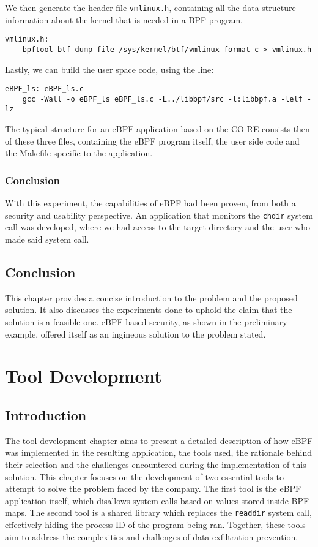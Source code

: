 We then generate the header file \texttt{vmlinux.h}, containing all the data structure information about the kernel that is needed in a BPF program.

\begin{lstlisting}
vmlinux.h:
	bpftool btf dump file /sys/kernel/btf/vmlinux format c > vmlinux.h
\end{lstlisting}

Lastly, we can build the user space code, using the line:
\begin{lstlisting}
eBPF_ls: eBPF_ls.c
	gcc -Wall -o eBPF_ls eBPF_ls.c -L../libbpf/src -l:libbpf.a -lelf -lz
\end{lstlisting}

The typical structure for an eBPF application based on the CO-RE consists then of these three files, containing the eBPF program itself, the user side code and the Makefile specific to the application.


\subsection{Conclusion}
With this experiment, the capabilities of eBPF had been proven, from both a security and usability perspective. An application that monitors the \texttt{chdir} system call was developed, where we had access to the target directory and the user who made said system call.

\section{Conclusion}
This chapter provides a concise introduction to the problem and the proposed solution. It also discusses the experiments done to uphold the claim that the solution is a feasible one.
eBPF-based security, as shown in the preliminary example, offered itself as an ingineous solution to the problem stated.


\chapter{Tool Development}

\section{Introduction}
The tool development chapter aims to present a detailed description of how eBPF was implemented in the resulting application, the tools used, the rationale behind their selection and the challenges encountered during the implementation of this solution.
This chapter focuses on the development of two essential tools to attempt to solve the problem faced by the company. The first tool is the eBPF application itself, which disallows system calls based on values stored inside BPF maps. The second tool is a shared library which replaces the \texttt{readdir} system call, effectively hiding the process ID of the program being ran. Together, these tools aim to address the complexities and challenges of data exfiltration prevention.

